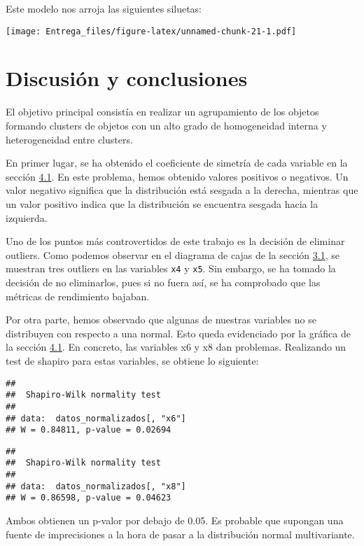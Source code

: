 \documentclass[
]{scrreprt}
\begin{document}
Este modelo nos arroja las siguientes siluetas:

\texttt{[image: Entrega\_files/figure-latex/unnamed-chunk-21-1.pdf]}

\hypertarget{discusiuxf3n-y-conclusiones}{%
\chapter{Discusión y conclusiones}\label{discusiuxf3n-y-conclusiones}}

El objetivo principal consistía en realizar un agrupamiento de los
objetos formando clusters de objetos con un alto grado de homogeneidad
interna y heterogeneidad entre clusters.

En primer lugar, se ha obtenido el coeficiente de simetría de cada
variable en la sección
\protect\hyperlink{Anuxe1lisisux5cux2520exploratorioux5cux2520univariante}{4.1}.
En este problema, hemos obtenido valores positivos o negativos. Un valor
negativo significa que la distribución está sesgada a la derecha,
mientras que un valor positivo indica que la distribución se encuentra
sesgada hacia la izquierda.

Uno de los puntos más controvertidos de este trabajo es la decisión de
eliminar outliers. Como podemos observar en el diagrama de cajas de la
sección \protect\hyperlink{Materiales}{3.1}, se muestran tres outliers
en las variables \texttt{x4} y \texttt{x5}. Sin embargo, se ha tomado la
decisión de no eliminarlos, pues si no fuera así, se ha comprobado que
las métricas de rendimiento bajaban.

Por otra parte, hemos observado que algunas de nuestras variables no se
distribuyen con respecto a una normal. Esto queda evidenciado por la
gráfica de la sección
\protect\hyperlink{Anuxe1lisisux5cux2520exploratorioux5cux2520univariante}{4.1}.
En concreto, las variables x6 y x8 dan problemas. Realizando un test de
shapiro para estas variables, se obtiene lo siguiente:

\begin{verbatim}
## 
##  Shapiro-Wilk normality test
## 
## data:  datos_normalizados[, "x6"]
## W = 0.84811, p-value = 0.02694
\end{verbatim}

\begin{verbatim}
## 
##  Shapiro-Wilk normality test
## 
## data:  datos_normalizados[, "x8"]
## W = 0.86598, p-value = 0.04623
\end{verbatim}

Ambos obtienen un p-valor por debajo de 0.05. Es probable que supongan
una fuente de imprecisiones a la hora de pasar a la distribución normal
multivariante.
\end{document}
